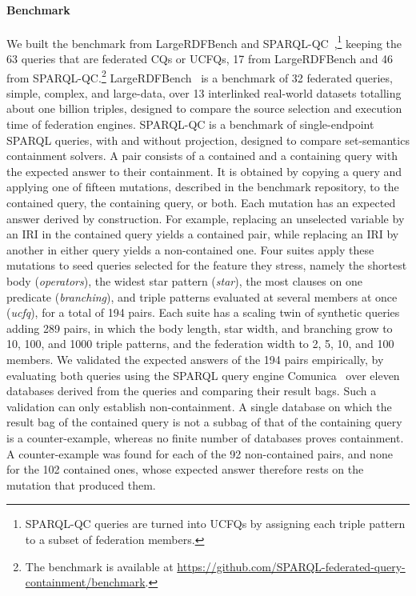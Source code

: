 \paragraph{Benchmark}
We built the benchmark from LargeRDFBench and SPARQL-QC~\cite{WudageChekol2013},\footnote{SPARQL-QC queries are turned into \acp{UCFQ} by assigning each triple pattern to a subset of federation members.} keeping the 63 queries that are federated \acp{CQ} or \acp{UCFQ}, 17 from LargeRDFBench and 46 from SPARQL-QC.\footnote{The benchmark is available at \url{https://github.com/SPARQL-federated-query-containment/benchmark}.}
LargeRDFBench~\cite{saleem2018largerdfbench} is a benchmark of 32 federated queries, simple, complex, and large-data, over 13 interlinked real-world datasets totalling about one billion triples, designed to compare the source selection and execution time of federation engines.
SPARQL-QC is a benchmark of single-endpoint SPARQL queries, with and without projection, designed to compare set-semantics containment solvers.
A pair consists of a contained and a containing query with the expected answer to their containment.
It is obtained by copying a query and applying one of fifteen mutations, described in the benchmark repository, to the contained query, the containing query, or both.
Each mutation has an expected answer derived by construction.
For example, replacing an unselected variable by an \ac{IRI} in the contained query yields a contained pair, while replacing an \ac{IRI} by another in either query yields a non-contained one.
Four suites apply these mutations to seed queries selected for the feature they stress, namely the shortest body (\emph{operators}), the widest star pattern (\emph{star}), the most clauses on one predicate (\emph{branching}), and triple patterns evaluated at several members at once (\emph{ucfq}), for a total of 194 pairs.
Each suite has a scaling twin of synthetic queries adding 289 pairs, in which the body length, star width, and branching grow to 10, 100, and 1000 triple patterns, and the federation width to 2, 5, 10, and 100 members.
We validated the expected answers of the 194 pairs empirically, by evaluating both queries using the SPARQL query engine Comunica~\cite{taelman_iswc_resources_comunica_2018} over eleven databases derived from the queries and comparing their result bags.
Such a validation can only establish non-containment.
A single database on which the result bag of the contained query is not a subbag of that of the containing query is a counter-example, whereas no finite number of databases proves containment.
A counter-example was found for each of the 92 non-contained pairs, and none for the 102 contained ones, whose expected answer therefore rests on the mutation that produced them.


